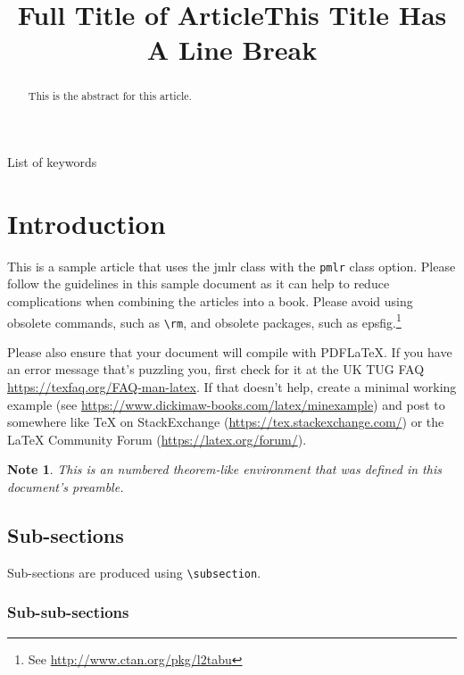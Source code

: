 \documentclass[mlmain]{jmlr}
\title[Short Title]{Full Title of Article\titlebreak This Title Has
A Line Break\titletag{\thanks{sample footnote}}}
\newtheorem*{note}{Note}
\begin{document}
\maketitle

\begin{abstract}
This is the abstract for this article.
\end{abstract}
\begin{keywords}
List of keywords
\end{keywords}

\section{Introduction}
\label{sec:intro}

This is a sample article that uses the \textsf{jmlr} class with
the \texttt{pmlr} class option.  Please follow the guidelines in
this sample document as it can help to reduce complications when
combining the articles into a book. Please avoid using obsolete
commands, such as \verb|\rm|, and obsolete packages, such as
\textsf{epsfig}.\footnote{See
\url{http://www.ctan.org/pkg/l2tabu}}

Please also ensure that your document will compile with PDF\LaTeX.
If you have an error message that's puzzling you, first check for it
at the UK TUG FAQ
\url{https://texfaq.org/FAQ-man-latex}.  If
that doesn't help, create a minimal working example (see
\url{https://www.dickimaw-books.com/latex/minexample}) and post
to somewhere like TeX on StackExchange
(\url{https://tex.stackexchange.com/}) or the LaTeX Community Forum
(\url{https://latex.org/forum/}).

\begin{note}
This is an numbered theorem-like environment that was defined in
this document's preamble.
\end{note}

\subsection{Sub-sections}

Sub-sections are produced using \verb|\subsection|.

\subsubsection{Sub-sub-sections}
\end{document}
